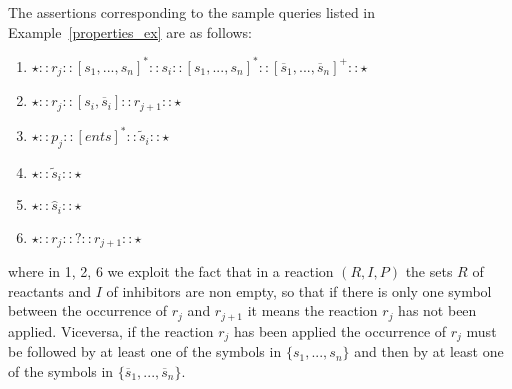 
\begin{example}
The assertions corresponding to the sample queries listed in Example~\ref{properties_ex} are as follows:
\begin{enumerate}
\item
$\star :: r_j :: [ s_1,...,s_n ]^* :: s_i :: [  s_1,...,s_n ]^* :: [  \overline{s}_1,...,\overline{s}_n ]^+ :: \star$
\item
$\star :: r_j :: [s_i, \overline{s}_i] :: r_{j+1} :: \star$
\item
$\star :: p_j :: [  \mathit{ents} ]^* :: \widetilde{s}_i :: \star$
\item
$\star :: \widetilde{s}_i :: \star$
\item
$\star :: \widehat{s}_i :: \star$
\item
$\star :: r_j :: ? :: r_{j+1} :: \star$
\end{enumerate}
where in 1, 2, 6 we exploit the fact that in a reaction $(R,I,P)$ the sets $R$ of reactants and  $I$ of inhibitors are non empty, so that if there is only one symbol between the occurrence of $r_j$ and $r_{j+1}$ it means the reaction $r_j$ has not been applied. Viceversa, if the reaction $r_j$ has been applied the occurrence of $r_j$ must be followed by at least one of the symbols in $\{s_1,...,s_n\}$ and then by at least one of the symbols in $\{\overline{s}_1,...,\overline{s}_n\}$.
\end{example}

